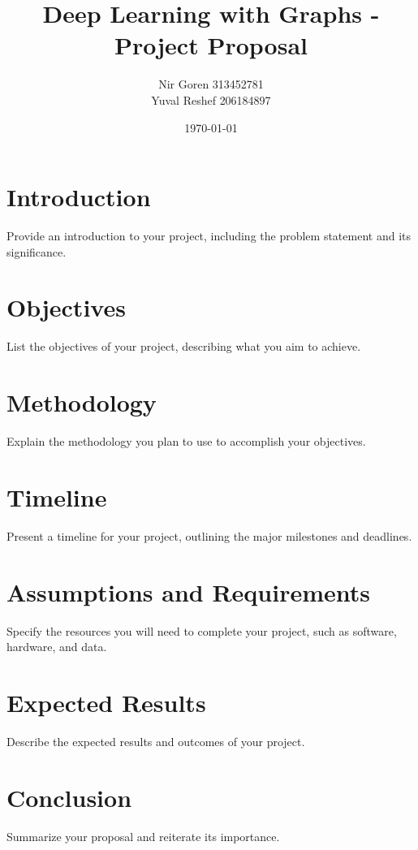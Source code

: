 \documentclass{article}
\title{Deep Learning with Graphs - Project Proposal}
\author{Nir Goren 313452781 \\ Yuval Reshef 206184897}
\date{\today}
\begin{document}
\maketitle

\section{Introduction}
Provide an introduction to your project, including the problem statement and its significance.

\section{Objectives}
List the objectives of your project, describing what you aim to achieve.

\section{Methodology}
Explain the methodology you plan to use to accomplish your objectives.

\section{Timeline}
Present a timeline for your project, outlining the major milestones and deadlines.

\section{Assumptions and Requirements}
Specify the resources you will need to complete your project, such as software, hardware, and data.

\section{Expected Results}
Describe the expected results and outcomes of your project.

\section{Conclusion}
Summarize your proposal and reiterate its importance.
\end{document}
